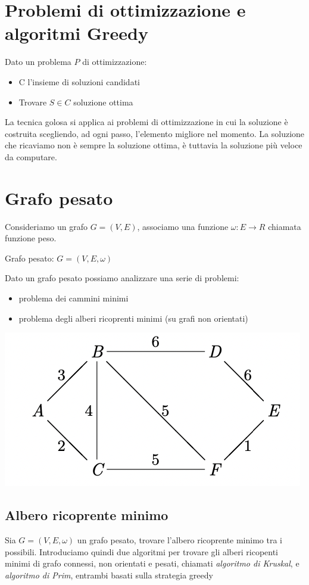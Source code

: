 \documentclass[11pt, oneside]{article}   	%
\begin{document}
\section*{Problemi di ottimizzazione e algoritmi Greedy}
Dato un problema $P$ di ottimizzazione:\begin{itemize}
\item C l'insieme di soluzioni candidati
\item Trovare $S \in C $ soluzione ottima
\end{itemize}
La tecnica golosa si applica ai problemi di ottimizzazione in cui la soluzione è costruita scegliendo, ad ogni passo, l'elemento migliore nel momento. La soluzione che ricaviamo non è sempre la soluzione ottima, è tuttavia la soluzione più veloce da computare.

\section*{Grafo pesato}
Consideriamo un grafo $G = (V, E)$, associamo una funzione $\omega : E \rightarrow R$ chiamata funzione peso.\begin{center}
Grafo pesato: $G = (V, E,\omega)$\end{center}
Dato un grafo pesato possiamo analizzare una serie di problemi:
\begin{itemize}
\item problema dei cammini minimi
\item problema degli alberi ricoprenti minimi (su grafi non orientati)
\end{itemize}
\begin{center}
\includegraphics[scale=0.6]{grafopesato}
\end{center}

\subsection*{Albero ricoprente minimo}
Sia  $G = (V, E,\omega)$ un grafo pesato, trovare l'albero ricoprente minimo tra i possibili. Introduciamo quindi due algoritmi per trovare gli alberi ricopenti minimi di grafo connessi, non orientati e pesati, chiamati \emph{algoritmo di Kruskal}, e \emph{algoritmo di Prim}, entrambi basati sulla strategia greedy
\end{document}
